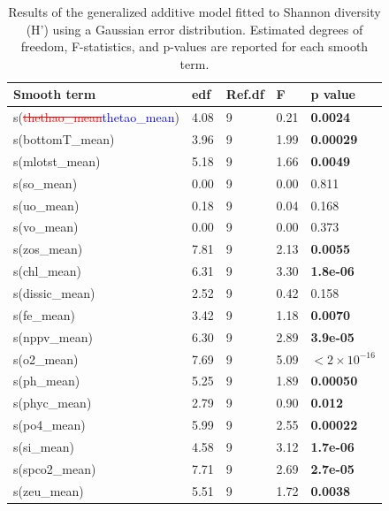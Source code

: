 \documentclass[a4paper,fleqn]{cas-sc}
\DeclareRobustCommand{\deleted}[1]{\textcolor{red}{\sout{#1}}}
\DeclareRobustCommand{\added}[1]{\textcolor{blue}{#1}}
\begin{document}
\begin{table}[width=\linewidth,cols=5,pos=!htbp]
\caption{Results of the generalized additive model fitted to Shannon diversity (H') using a Gaussian error distribution. Estimated degrees of freedom, F-statistics, and p-values are reported for each smooth term.}
\begin{tabular*}{\tblwidth}{@{} LLLLL @{}}
\toprule
\textbf{Smooth term} & \textbf{edf} & \textbf{Ref.df} & \textbf{F} & \textbf{p value} \\
\midrule
s(\deleted{thethao\_mean}\added{thetao\_mean})      & 4.08 & 9 & 0.21 & \textbf{0.0024} \\
s(bottomT\_mean) & 3.96 & 9 & 1.99 & \textbf{0.00029} \\
s(mlotst\_mean)   & 5.18 & 9 & 1.66 & \textbf{0.0049} \\
s(so\_mean)       & 0.00 & 9 & 0.00 & 0.811 \\
s(uo\_mean)       & 0.18 & 9 & 0.04 & 0.168 \\
s(vo\_mean)       & 0.00 & 9 & 0.00 & 0.373 \\
s(zos\_mean)      & 7.81 & 9 & 2.13 & \textbf{0.0055} \\
s(chl\_mean)      & 6.31 & 9 & 3.30 & \textbf{1.8e-06} \\
s(dissic\_mean)   & 2.52 & 9 & 0.42 & 0.158 \\
s(fe\_mean)       & 3.42 & 9 & 1.18 & \textbf{0.0070} \\
s(nppv\_mean)     & 6.30 & 9 & 2.89 & \textbf{3.9e-05} \\
s(o2\_mean)       & 7.69 & 9 & 5.09 & \textbf{$<2 \times 10^{-16}$} \\
s(ph\_mean)       & 5.25 & 9 & 1.89 & \textbf{0.00050} \\
s(phyc\_mean)     & 2.79 & 9 & 0.90 & \textbf{0.012} \\
s(po4\_mean)      & 5.99 & 9 & 2.55 & \textbf{0.00022} \\
s(si\_mean)       & 4.58 & 9 & 3.12 & \textbf{1.7e-06} \\
s(spco2\_mean)    & 7.71 & 9 & 2.69 & \textbf{2.7e-05} \\
s(zeu\_mean)      & 5.51 & 9 & 1.72 & \textbf{0.0038} \\
\bottomrule
\end{tabular*}
\label{tab:11}
\end{table}
\end{document}
